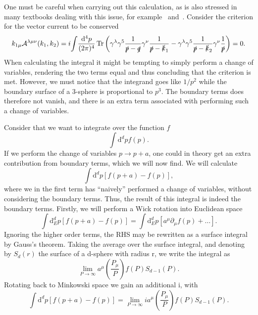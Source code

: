 One must be careful when carrying out this calculation, as is also stressed in many textbooks dealing with this issue, for example~\cite{kachelriessQuantumFieldsHubble2018} and~\cite{zeeQuantumFieldTheory2010}.
Consider the criterion for the vector current to be conserved
\begin{equation}
  \label{eq:criterion-conserved}
  k_{1\mu } \mathcal{A} ^{\lambda \mu \nu } (k_1, k_2) =
  i\! \int\! \frac{\mathrm{d}^4p}{ (2\pi)^{4}}
  \operatorname{Tr}\left(
    \gamma ^{\lambda } \gamma ^5 \frac{1}{\slashed{p} - \slashed{q}} \gamma ^{\nu}
    \frac{1}{\slashed{p} - \slashed{k}_{1}}
    -
    \gamma ^{\lambda }\gamma ^5 \frac{1}{\slashed{p} -\slashed{k}_{2}} \gamma ^{\nu }\frac{1}{\slashed{p}}
  \right)
  = 0.
\end{equation}
When calculating the integral it might be tempting to simply perform a change of variables, rendering the two terms equal and thus concluding that the criterion  is met.
However, we must notice that the integrand goes like $1 / p^2$ while the boundary surface of a 3-sphere is proportional to $p^3$.
The boundary terms does therefore not vanish, and there is an extra term associated with performing such a change of variables.

Consider that we want to integrate over the function $f$
\begin{equation}
  \int \mathrm{d}^dp f(p).
\end{equation}
If we perform the change of variables $p \to p+a$, one could in theory get an extra contribution from boundary terms, which we will now find.
We will calculate
\begin{equation}
  \int \mathrm{d}^dp \left[ f(p+a) - f(p) \right],
\end{equation}
where we in the first term has ``naively'' performed a change of variables, without considering the boundary terms.
Thus, the result of this integral is indeed the boundary terms.
Firstly, we will perform a Wick rotation into Euclidean space
\begin{equation}
  \int \mathrm{d}^d_Ep \left[ f(p+a) - f(p) \right]
  = \int \mathrm{d}_E^d p \left[ a^{\mu }\partial_{\mu} f(p) + \dots \right].
\end{equation}
Ignoring the higher order terms, the RHS may be rewritten as a surface integral by Gauss's theorem.
Taking the average over the surface integral, and denoting by $S_d(r)$ the surface of a d-sphere with radius r, we write the integral as
\begin{equation}
  \lim_{P\to \infty } a^{\mu } \left( \frac{P_{\mu }}{P} \right) f(P) S_{d-1}(P).
\end{equation}
Rotating back to Minkowski space we gain an additional i, with
\begin{equation}
  \label{eq:shift-trickery}
  \int \mathrm{d}^{d}p \left[ f(p+a) - f(p) \right]
  = \lim_{P\to \infty } ia^{\mu } \left( \frac{P_{\mu }}{P} \right) f(P) S_{d-1}(P).
\end{equation}


